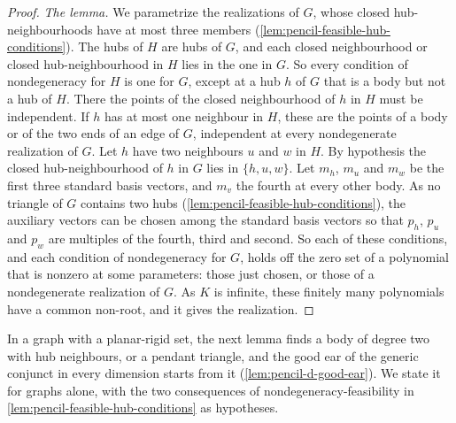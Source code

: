 \begin{proof}
  \emph{The lemma.} We parametrize the realizations of $G$, whose closed
  hub-neighbourhoods have at most three members
  (\cref{lem:pencil-feasible-hub-conditions}). The hubs of $H$ are hubs of
  $G$, and each closed neighbourhood or closed hub-neighbourhood in $H$
  lies in the one in $G$. So every condition of nondegeneracy for $H$ is
  one for $G$, except at a hub $h$ of $G$ that is a body but not a hub of
  $H$. There the points of the closed neighbourhood of $h$ in $H$ must be
  independent. If $h$ has at most one neighbour in $H$, these are the
  points of a body or of the two ends of an edge of $G$, independent at
  every nondegenerate realization of $G$. Let $h$ have two neighbours $u$
  and $w$ in $H$. By hypothesis the closed hub-neighbourhood of $h$ in $G$
  lies in $\{h, u, w\}$. Let $m_h$, $m_u$ and $m_w$ be the first three
  standard basis vectors, and $m_v$ the fourth at every other body. As no
  triangle of $G$ contains two hubs
  (\cref{lem:pencil-feasible-hub-conditions}), the auxiliary vectors can
  be chosen among the standard basis vectors so that $p_h$, $p_u$ and
  $p_w$ are multiples of the fourth, third and second. So each of these
  conditions, and each condition of nondegeneracy for $G$, holds off the
  zero set of a polynomial that is nonzero at some parameters: those just
  chosen, or those of a nondegenerate realization of $G$. As $K$ is
  infinite, these finitely many polynomials have a common non-root, and it
  gives the realization.
\end{proof}

In a graph with a planar-rigid set, the next lemma finds a body of degree
two with hub neighbours, or a pendant triangle, and the good ear of the
generic conjunct in every dimension starts from it
(\cref{lem:pencil-d-good-ear}). We state it for graphs alone, with the two
consequences of nondegeneracy-feasibility in
\cref{lem:pencil-feasible-hub-conditions} as hypotheses.

